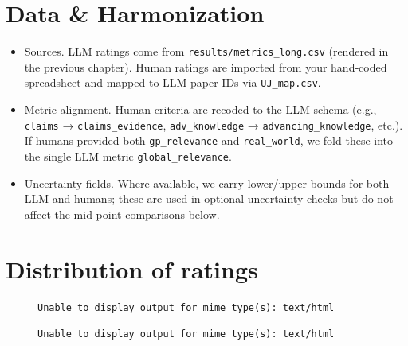 \documentclass[
  11pt,
  letterpaper,
  DIV=11,
  numbers=noendperiod]{scrreprt}
\providecommand{\tightlist}{%
  \setlength{\itemsep}{0pt}\setlength{\parskip}{0pt}}\usepackage{longtable,booktabs,array}
\begin{document}
\section{Data \& Harmonization}\label{data-harmonization}

\begin{itemize}
\tightlist
\item
  Sources. LLM ratings come from \texttt{results/metrics\_long.csv}
  (rendered in the previous chapter). Human ratings are imported from
  your hand‑coded spreadsheet and mapped to LLM paper IDs via
  \texttt{UJ\_map.csv}.\\
\item
  Metric alignment. Human criteria are recoded to the LLM schema (e.g.,
  \texttt{claims} → \texttt{claims\_evidence}, \texttt{adv\_knowledge} →
  \texttt{advancing\_knowledge}, etc.). If humans provided both
  \texttt{gp\_relevance} and \texttt{real\_world}, we fold these into
  the single LLM metric \texttt{global\_relevance}.\\
\item
  Uncertainty fields. Where available, we carry lower/upper bounds for
  both LLM and humans; these are used in optional uncertainty checks but
  do not affect the mid‑point comparisons below.
\end{itemize}

\section{Distribution of ratings}\label{distribution-of-ratings}

\begin{figure}

\caption{\label{fig-scatter-ellipses}}

\captionsetup{labelsep=none}


\begin{verbatim}
Unable to display output for mime type(s): text/html
\end{verbatim}

\subcaption{\label{fig-scatter-ellipses-2}}

\captionsetup{labelsep=none}

\begin{verbatim}
Unable to display output for mime type(s): text/html
\end{verbatim}

\end{figure}%
\end{document}
